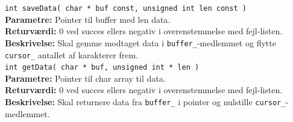 \verb+int saveData( char * buf const, unsigned int len const )+ \\
\textbf{Parametre:} Pointer til buffer med len data. \\
\textbf{Returværdi:} 0 ved succes ellers negativ i overenstemmelse med fejl-listen. \\
\textbf{Beskrivelse:} Skal gemme modtaget data i \verb+buffer_+-medlemmet og flytte \verb+cursor_+ antallet af karakterer frem.\\

\verb+int getData( char * buf, unsigned int * len )+ \\
\textbf{Parametre:} Pointer til char array til data. \\
\textbf{Returværdi:} 0 ved succes ellers negativ i overenstemmelse med fejl-listen. \\
\textbf{Beskrivelse:} Skal returnere data fra \verb+buffer_+ i pointer og nulstille \verb+cursor_+-medlemmet.\\